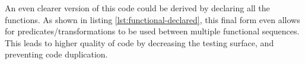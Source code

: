 \begin{minipage}{\linewidth}

\end{minipage}

An even clearer version of this code could be derived by declaring all the functions.  As shown in listing  \ref{lst:functional-declared}, this final form even allows for predicates/transformations to be used between multiple functional sequences.  This leads to higher quality of code by decreasing the testing surface, and preventing code duplication. 